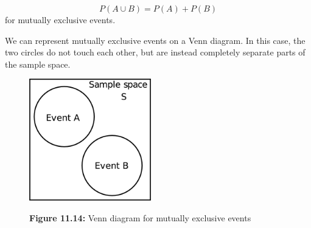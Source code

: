     \begin{equation}
    P\left(A\cup B\right)=P\left(A\right)+P\left(B\right)\tag{11.9}
      \end{equation}
      \label{m39377*id114906}for mutually exclusive events.\par 
\label{m39377*eip-366}We can represent mutually exclusive events on a Venn diagram. In this case, the two circles do not touch each other, but are instead completely separate parts of the sample space.
    \setcounter{subfigure}{0}
	\begin{figure}[H] %
    \begin{center}
    \label{m39377*id6899!!!underscore!!!media}\label{m39377*id6899!!!underscore!!!printimage}\includegraphics[width=200px]{col11306.imgs/m39377_mutualexclusive.png} %
      \vspace{2pt}
    \vspace{\rubberspace}\par \begin{cnxcaption}
	  \small \textbf{Figure 11.14: }Venn diagram for mutually exclusive events
	\end{cnxcaption}
    \vspace{.1in}
    \end{center}
 \end{figure}       
\par \label{m39377*secfhsst!!!underscore!!!id1048}
